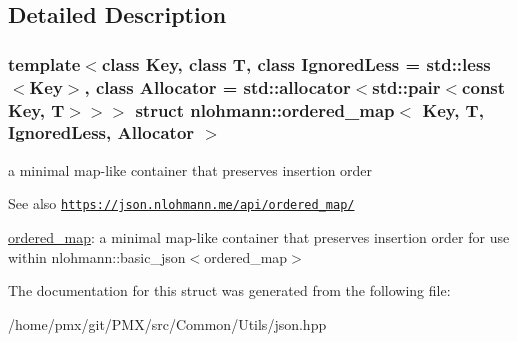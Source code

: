 \subsection{Detailed Description}
\subsubsection*{template$<$class Key, class T, class Ignored\+Less = std\+::less$<$\+Key$>$, class Allocator = std\+::allocator$<$std\+::pair$<$const Key, T$>$$>$$>$\newline
struct nlohmann\+::ordered\+\_\+map$<$ Key, T, Ignored\+Less, Allocator $>$}

a minimal map-\/like container that preserves insertion order 

\begin{DoxySeeAlso}{See also}
\href{https://json.nlohmann.me/api/ordered_map/}{\tt https\+://json.\+nlohmann.\+me/api/ordered\+\_\+map/}
\end{DoxySeeAlso}
\hyperlink{structnlohmann_1_1ordered__map}{ordered\+\_\+map}\+: a minimal map-\/like container that preserves insertion order for use within nlohmann\+::basic\+\_\+json$<$ordered\+\_\+map$>$ 

The documentation for this struct was generated from the following file\+:\begin{DoxyCompactItemize}
\item 
/home/pmx/git/\+P\+M\+X/src/\+Common/\+Utils/json.\+hpp\end{DoxyCompactItemize}
